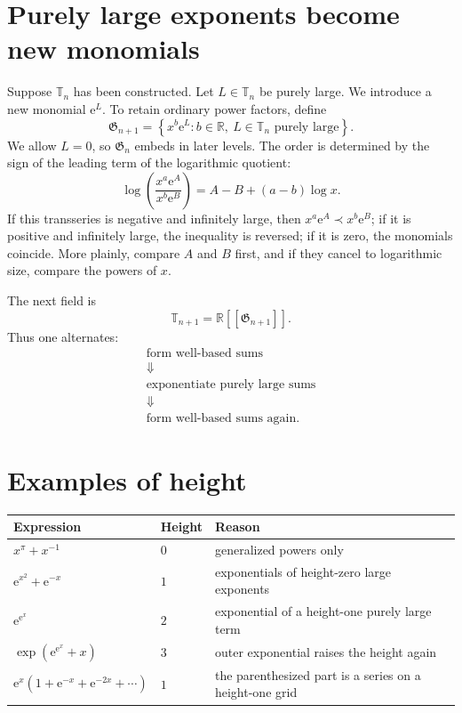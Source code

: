 \documentclass[11pt,openany]{book}
\theoremstyle{definition}
\theoremstyle{plain}
\theoremstyle{remark}
\newcommand{\R}{\mathbb{R}}
\newcommand{\T}{\mathbb{T}}
\newcommand{\G}{\mathfrak{G}}
\newcommand{\e}{\mathrm{e}}
\newcommand{\precdom}{\prec}
\begin{document}
\section{Purely large exponents become new monomials}

Suppose $\T_n$ has been constructed. Let $L\in\T_n$ be purely large. We introduce a new monomial $\e^L$. To retain ordinary power factors, define
\begin{equation}\label{eq:G-next}
 \G_{n+1}
 =\left\{x^b\e^L:
 b\in\R,\ L\in\T_n\text{ purely large}\right\}.
\end{equation}
We allow $L=0$, so $\G_n$ embeds in later levels. The order is determined by the sign of the leading term of the logarithmic quotient:
\[
 \log\!\left(\frac{x^a\e^A}{x^b\e^B}\right)
 =A-B+(a-b)\log x.
\]
If this transseries is negative and infinitely large, then
$x^a\e^A\precdom x^b\e^B$; if it is positive and infinitely large, the
inequality is reversed; if it is zero, the monomials coincide. More plainly,
compare $A$ and $B$ first, and if they cancel to logarithmic size, compare the
powers of $x$.

The next field is
\begin{equation}\label{eq:T-next}
 \T_{n+1}=\R[[\G_{n+1}]].
\end{equation}
Thus one alternates:
\[
 \begin{gathered}
  \boxed{\text{form well-based sums}}\\[-0.15ex]
  \Downarrow\\[-0.15ex]
  \boxed{\text{exponentiate purely large sums}}\\[-0.15ex]
  \Downarrow\\[-0.15ex]
  \boxed{\text{form well-based sums again}}.
 \end{gathered}
\]

\section{Examples of height}

\begin{center}
\small
\begin{tabularx}{\textwidth}{@{}p{}p{}X@{}}
\toprule
Expression & Height & Reason \\
\midrule
$x^{\pi}+x^{-1}$ & $0$ & generalized powers only \\
$\e^{x^2}+\e^{-x}$ & $1$ & exponentials of height-zero large exponents \\
$\e^{\e^x}$ & $2$ & exponential of a height-one purely large term \\
$\exp(\e^{\e^x}+x)$ & $3$ & outer exponential raises the height again \\
$\e^x(1+\e^{-x}+\e^{-2x}+\cdots)$ & $1$ & the parenthesized part is a series on a height-one grid \\
\bottomrule
\end{tabularx}
\end{center}
\end{document}

